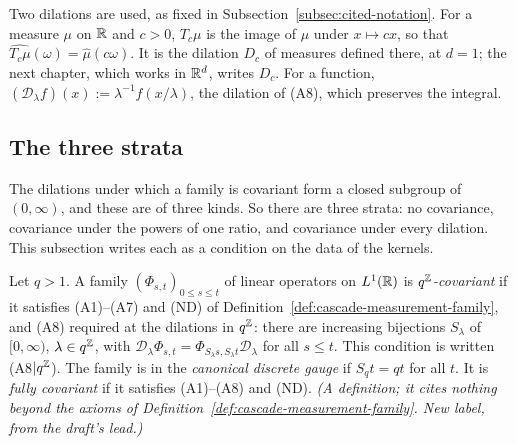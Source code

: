 Two dilations are used, as fixed in Subsection~\ref{subsec:cited-notation}. For a measure $\mu$ on
$\mathbb{R}$ and $c > 0$, $T_c\mu$ is the image of $\mu$ under $x \mapsto cx$, so that
$\widehat{T_c\mu}(\omega) = \widehat\mu(c\omega)$. It is the dilation $D_c$ of measures defined
there, at $d = 1$; the next chapter, which works in $\mathbb{R}^d$, writes $D_c$. For a function,
$(\mathcal{D}_\lambda f)(x) := \lambda^{-1}f(x/\lambda)$, the dilation of (A8), which preserves the
integral.

\subsection{The three strata}
\label{subsec:line-strata}

The dilations under which a family is covariant form a closed subgroup of $(0,\infty)$, and
these are of three kinds. So there are three strata: no covariance, covariance under the powers
of one ratio, and covariance under every dilation. This subsection writes each as a condition on
the \Levy{} data of the kernels.

\begin{definition}
\label{def:q-covariant-line}
\leanok
{}
Let $q > 1$. A family $(\Phi_{s,t})_{0 \le s \le t}$ of linear operators on $L^1(\mathbb{R})$ is
\emph{$q^{\mathbb{Z}}$-covariant} if it satisfies (A1)--(A7) and (ND) of
Definition~\ref{def:cascade-measurement-family}, and (A8) required at the dilations in $q^{\mathbb{Z}}$:
there are increasing bijections $S_\lambda$ of $[0,\infty)$, $\lambda \in q^{\mathbb{Z}}$, with
$\mathcal{D}_\lambda\Phi_{s,t} = \Phi_{S_\lambda s, S_\lambda t}\mathcal{D}_\lambda$ for all
$s \le t$. This condition is written (A8$|q^{\mathbb{Z}}$). The family is in the \emph{canonical
discrete gauge} if $S_qt = qt$ for all $t$. It is \emph{fully covariant} if it satisfies
(A1)--(A8) and (ND).
\statusT\quad\emph{(A definition; it cites nothing beyond the axioms of
Definition~\ref{def:cascade-measurement-family}. New label, from the draft's lead.)}
\end{definition}

